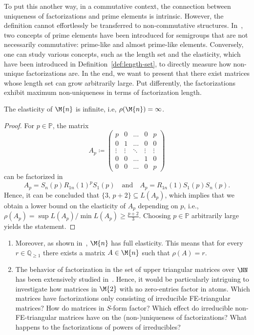 To put this another way, in a commutative context, the connection between uniqueness of factorizations and prime elements is intrinsic. However, the definition cannot effortlessly be transferred to non-commutative structures. In~\cite[Section 1.1]{Baeth2020}, two concepts of prime elements have been introduced for semigroups that are not necessarily commutative: prime-like and almost prime-like elements. Conversely, one can study various concepts, such as the length set and the elasticity, which have been introduced in Definition~\ref{def:length-set}, to directly measure how non-unique factorizations are. In the end, we want to present that there exist matrices whose length set can grow arbitrarily large. Put differently, the factorizations exhibit maximum non-uniqueness in terms of factorization length.

\begin{proposition}
The elasticity of $\M{n}$ is infinite, i.e, $\rho(\M{n}) = \infty$.
\end{proposition}

\begin{proof}
For $p \in \mathbb{P}$, the matrix 
\[ A_p \coloneqq \begin{pmatrix} p & 0 & \ldots & 0 & p \\ 0 & 1 & \ldots &  0 & 0\\ \vdots & \vdots & \ddots & \vdots & \vdots \\ 0 & 0  & \ldots & 1 & 0 \\ 0 & 0 & \ldots & 0 &  p \end{pmatrix} \]
can be factorized in
\[ A_p = S_n(p) R_{1n}(1)^p S_1(p) \quad \text{and} \quad A_p = R_{1n}(1) S_1(p) S_n(p).  \]
Hence, it can be concluded that $\{3,\,p+2\} \subseteq L(A_p)$, which implies that we obtain a lower bound on the elasticity of $A_p$ depending on $p$, i.e., $\rho(A_p) = \sup L(A_p)/\min L(A_p) \geq \frac{p+2}{3}$. Choosing $p \in \mathbb{P}$ arbitrarily large yields the statement.
\end{proof}

\begin{remark*}
\mbox{}\vspace{-2\topskip}
\begin{enumerate}[label=(\alph*)]
\item Moreover, as shown in~\cite[Theorem 3.11]{Baeth2020}, $\M{n}$ has full elasticity. This means that for every $r \in \mathbb{Q}_{\geq 1}$ there exists a matrix $A \in \M{n}$ such that $\rho(A) = r$.
\item The behavior of factorization in the set of upper triangular matrices over $\NN$ has been extensively studied in~\cite[Section 3]{Baeth2020}. Hence, it would be particularly intriguing to investigate how matrices in $\M{2}$ with no zero-entries factor in atoms. Which matrices have factorizations only consisting of irreducible FE-triangular matrices? How do matrices in $S$-form factor? Which effect do irreducible non-FE-triangular matrices have on the (non-)uniqueness of factorizations? What happens to the factorizations of powers of irreducibles?
\end{enumerate}
\end{remark*}